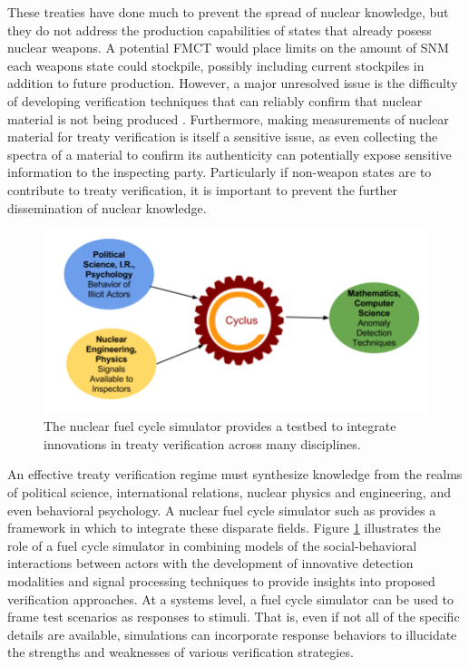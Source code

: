 These treaties have done much to prevent the spread of nuclear knowledge, but they do not address the production capabilities of states that already posess nuclear weapons.  A potential \gls{FMCT} would place limits on the amount of \gls{SNM} each weapons state could stockpile, possibly including current stockpiles in addition to future production.  However, a major unresolved issue is the difficulty of developing verification techniques that can reliably confirm that nuclear material is not being produced \cite{_fissile_2013}.  Furthermore, making measurements of nuclear material for treaty verification is itself a sensitive issue, as even collecting the spectra of a material to confirm its authenticity can potentially expose sensitive information to the inspecting party\cite{glaser_zero-knowledge_2014}. Particularly if non-weapon states are to contribute to treaty verification, it is important to prevent the further dissemination of nuclear knowledge.

\begin{figure}%
\begin{center}
\includegraphics[natwidth=162bp,natheight=227bp, scale=0.5]{./figs/cyclus_interdiscipline.png}
\end{center}
\caption{The \Cyclus nuclear fuel cycle simulator provides a testbed to integrate innovations in treaty verification across many disciplines.}
\label{fig:cyclus_diagram}
\end{figure}

An effective treaty verification regime must synthesize knowledge from the realms of political science, international relations, nuclear physics and engineering, and even behavioral psychology.  A nuclear fuel cycle simulator such as \Cyclus provides a framework in which to integrate these disparate fields.  Figure \ref{fig:cyclus_diagram} illustrates  the role of a fuel cycle simulator in combining models of the social-behavioral interactions between actors with the development of innovative detection modalities and signal processing techniques to provide insights into proposed verification approaches.  At a systems level, a fuel cycle simulator can be used to frame test scenarios as responses to stimuli. That is, even if not all of the specific details are available, simulations can incorporate response behaviors to illucidate the strengths and weaknesses of various verification strategies.


